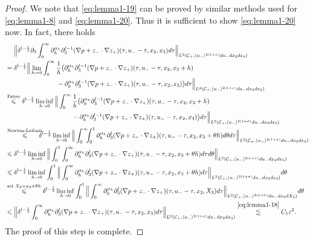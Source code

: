 \documentclass[10pt,reqno]{amsart}
\numberwithin{equation}{section}
\begin{document}
\begin{proof}
 We note that \eqref{eq:lemma1-19} can be proved by similar methods used for  \eqref{eq:lemma1-8} and \eqref{eq:lemma1-20}. Thus it is sufficient to show \eqref{eq:lemma1-20} now. 
In fact,  
there holds  
\begin{align*}
	&\ \ \ \ \Big\|\delta^{l-\frac{1}{2}}\partial_3\int_0^{\infty} \partial_h^{\alpha_h}\partial_3^{l-1}(\nabla p+z_{-}\cdot\nabla z_{+}) (\tau,u_--\tau,x_2,x_3)d\tau \Big\|_{L^2(\mathcal{C}_+,\langle u_{-}\rangle^{2(1+\sigma)}du_-dx_2dx_3)}\\
	&=\delta^{l-\frac{1}{2}}\Big\|\lim_{h\to 0} \int_0^{\infty}\frac{1}{h}\big(\partial_h^{\alpha_h}\partial_3^{l-1}(\nabla p+z_{-}\cdot\nabla z_{+}) (\tau,u_--\tau,x_2,x_3+h)\\
	&\ \ \ \ \ \ \ \ \ \ \ \ \ \ \ \ \ \ \ \ \ \ \ \  -\partial_h^{\alpha_h}\partial_3^{l-1}(\nabla p+z_{-}\cdot\nabla z_{+}) (\tau,u_--\tau,x_2,x_3)\big)
	d\tau \Big\|_{L^2(\mathcal{C}_+,\langle u_{-}\rangle^{2(1+\sigma)}du_-dx_2dx_3)}\\
	&\stackrel{\text{Fatou}}{\leqslant}\delta^{l-\frac{1}{2}}\liminf_{h\to 0}\Big\| \int_0^{\infty}\frac{1}{h}\big(\partial_h^{\alpha_h}\partial_3^{l-1}(\nabla p+z_{-}\cdot\nabla z_{+}) (\tau,u_--\tau,x_2,x_3+h)\\
	&\ \ \ \ \ \ \ \ \ \ \ \ \ \ \ \ \ \ \ \ \ \ \ \ \ \ \ \ \ \ \  -\partial_h^{\alpha_h}\partial_3^{l-1}(\nabla p+z_{-}\cdot\nabla z_{+}) (\tau,u_--\tau,x_2,x_3)\big)
	d\tau \Big\|_{L^2(\mathcal{C}_+,\langle u_{-}\rangle^{2(1+\sigma)}du_-dx_2dx_3)}\\
	&\stackrel{\text{Newton-Leibniz}}{\leqslant}\!\!\!\!\!\delta^{l-\frac{1}{2}}\liminf_{h\to 0}\Big\| \int_0^{\infty}\!\!\!\int_0^1\partial_h^{\alpha_h}\partial_3^{l}(\nabla p+z_{-}\cdot\nabla z_{+}) (\tau,u_--\tau,x_2,x_3+\theta h)d\theta d\tau \Big\|_{L^2(\mathcal{C}_+,\langle u_{-}\rangle^{2(1+\sigma)}du_-dx_2dx_3)}\\
	&\leqslant\delta^{l-\frac{1}{2}}\liminf_{h\to 0}\Big\|\int_0^1 \int_0^{\infty}\partial_h^{\alpha_h}\partial_3^{l}(\nabla p+z_{-}\cdot\nabla z_{+}) (\tau,u_--\tau,x_2,x_3+\theta h)d\tau d\theta  \Big\|_{L^2(\mathcal{C}_+,\langle u_{-}\rangle^{2(1+\sigma)}du_-dx_2dx_3)}\\
	&\leqslant\delta^{l-\frac{1}{2}}\liminf_{h\to 0}\int_0^1\Big\| \int_0^{\infty}\partial_h^{\alpha_h}\partial_3^{l}(\nabla p+z_{-}\cdot\nabla z_{+}) (\tau,u_--\tau,x_2,x_3+\theta h)d\tau  \Big\|_{L^2(\mathcal{C}_+,\langle u_{-}\rangle^{2(1+\sigma)}du_-dx_2dx_3)}d\theta \\
	&\stackrel{\text{set }X_3=x_3+\theta h}{\leqslant}\delta^{l-\frac{1}{2}}\liminf_{h\to 0}\int_0^1\Big\| \int_0^{\infty}\partial_h^{\alpha_h}\partial_3^{l}(\nabla p+z_{-}\cdot\nabla z_{+}) (\tau,u_--\tau,x_2,X_3)d\tau  \Big\|_{L^2(\mathcal{C}_+,\langle u_{-}\rangle^{2(1+\sigma)}du_-dx_2dX_3)}d\theta\\
	&\leqslant \Big\|\delta^{l-\frac{1}{2}}\int_0^{\infty} \partial_h^{\alpha_h}\partial_3^l(\nabla p+z_{-}\cdot\nabla z_{+}) 
	(\tau,u_--\tau,x_2,x_3)d\tau\Big\|_{L^2(\mathcal{C}_+,\langle u_-\rangle^{2(1+\sigma)}du_-dx_2dx_3)}
	\stackrel{\eqref{eq:lemma1-18}}{\lesssim} C_1\varepsilon^2.
\end{align*}
The proof of this step is complete. 
	

\end{proof}
\end{document}

